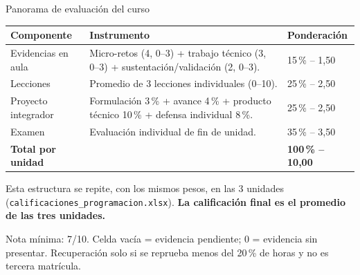 \documentclass[aspectratio=169,11pt]{beamer}
\begin{document}
\begin{frame}{Panorama de evaluación del curso}
\scriptsize
\centering
\renewcommand{\arraystretch}{1.05}
\begin{tabularx}{\textwidth}{L{2.6cm}Y C{1.8cm}}
\toprule
\textbf{Componente} & \textbf{Instrumento} & \textbf{Ponderación} \\
\midrule
Evidencias en aula & Micro-retos (4, 0--3) + trabajo técnico (3, 0--3) + sustentación/validación (2, 0--3). & 15\,\% -- 1,50 \\
Lecciones & Promedio de 3 lecciones individuales (0--10). & 25\,\% -- 2,50 \\
Proyecto integrador & Formulación 3\,\% + avance 4\,\% + producto técnico 10\,\% + defensa individual 8\,\%. & 25\,\% -- 2,50 \\
Examen & Evaluación individual de fin de unidad. & 35\,\% -- 3,50 \\
\midrule
\textbf{Total por unidad} & & \textbf{100\,\% -- 10,00} \\
\bottomrule
\end{tabularx}
\begin{keybox}[top=2pt,bottom=2pt]
\footnotesize Esta estructura se repite, con los mismos pesos, en las 3 unidades (\texttt{calificaciones\_programacion.xlsx}). \textbf{La calificación final es el promedio de las tres unidades.}
\end{keybox}
\begin{warnbox}[top=2pt,bottom=2pt]
\footnotesize Nota mínima: 7/10. Celda vacía = evidencia pendiente; 0 = evidencia sin presentar. Recuperación solo si se reprueba menos del 20\,\% de horas y no es tercera matrícula.
\end{warnbox}
\end{frame}
\end{document}
